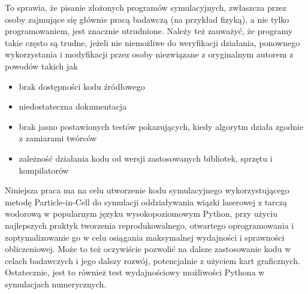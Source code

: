     To sprawia, że pisanie złożonych programów symulacyjnych, zwłaszcza przez osoby
    zajmujące się głównie pracą badawczą (na przykład fizyką), a nie
    tylko programowaniem,
    jest znacznie utrudnione. Należy też zauważyć, że programy takie często są
    trudne, jeżeli nie niemożliwe do weryfikacji działania, ponownego wykorzystania
    i modyfikacji przez osoby niezwiązane z oryginalnym autorem z powodów takich jak
    \begin{itemize}
        \item brak dostępności kodu źródłowego
        \item niedostateczna dokumentacja
        \item brak jasno postawionych testów pokazujących, kiedy algorytm działa zgodnie z zamiarami twórców
        \item zależność działania kodu od wersji zastosowanych bibliotek, sprzętu i kompilatorów
    \end{itemize}

    Niniejsza praca ma na celu utworzenie kodu symulacyjnego wykorzystującego metodę Particle-in-Cell
    do symulacji oddziaływania wiązki laserowej z tarczą wodorową w popularnym języku
    wysokopoziomowym Python, przy użyciu najlepszych praktyk tworzenia reprodukowalnego, otwartego oprogramowania
    i zoptymalizowanie go w celu osiągania maksymalnej wydajności i sprawności obliczeniowej. Może to też oczywiście
    pozwolić na dalsze
    zastosowanie kodu w celach badawczych i jego dalszy rozwój, potencjalnie z użyciem kart graficznych.
    Ostatecznie, jest to również test wydajnościowy możliwości Pythona w symulacjach 
    numerycznych.
